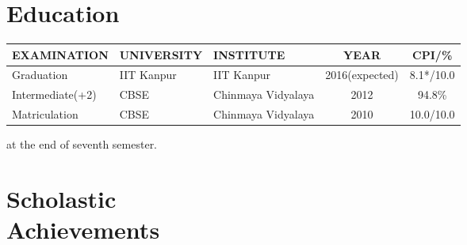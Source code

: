 \documentclass[margin,10pt]{resume}
\renewcommand{\baselinestretch}{1.2}
\begin{document}
\address{\small Final Year Undergraduate\\\small Computer Science and Engineering \\\small Indian Institute of Technology Kanpur}
\address{\small phone: +918765162302\\\small email: ksaurav@iitk.ac.in, 2020saurav@gmail.com\\\small homepage: \url{http://home.iitk.ac.in/~ksaurav}}

\begin{resume}
\section{\mysidestyle Education}
\vspace{2mm}
\begin{table}[h]
\renewcommand{\arraystretch}{1.5}
\vspace{5mm}
\begin{tabularx}{\textwidth}{X X l c c}
\hline

EXAMINATION      & UNIVERSITY & INSTITUTE          & YEAR           & CPI/\%    \\ \hline

Graduation       & IIT Kanpur & IIT Kanpur         & 2016(expected) & 8.1*/10.0 \\ \hline

Intermediate(+2) & CBSE       & Chinmaya Vidyalaya & 2012           & 94.8\%    \\ \hline

Matriculation    & CBSE       & Chinmaya Vidyalaya & 2010           & 10.0/10.0    \\ \hline

\end{tabularx}

{\vspace{2mm}\small * at the end of seventh semester.}
\end{table}

\vspace{-2mm}
\section{\mysidestyle Scholastic\\Achievements}

\begin{list2}
\begin{spacing}{1.4}
\renewcommand{\baselinestretch}{1.3}


\end{spacing}
\end{list2}
\end{resume}
\end{document}
